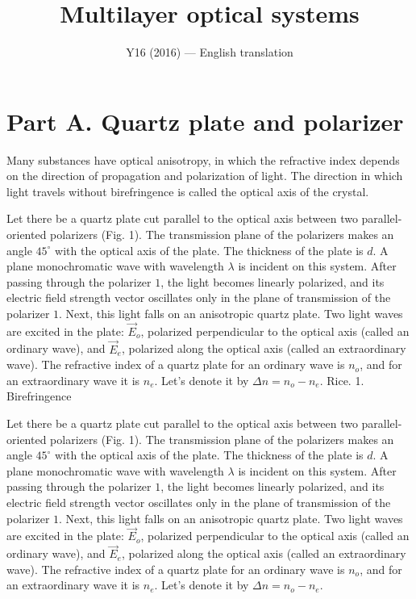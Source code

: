 \documentclass[11pt,a4paper]{article}
\title{\textbf{Multilayer optical systems}}
\author{\normalsize Y16 (2016) --- English translation}
\date{}
\begin{document}
\maketitle

\section*{Part A. Quartz plate and polarizer}

Many substances have optical anisotropy, in which the refractive index depends on the direction of propagation and polarization of light. The direction in which light travels without birefringence is called the optical axis of the crystal.

Let there be a quartz plate cut parallel to the optical axis between two parallel-oriented polarizers (Fig. 1). The transmission plane of the polarizers makes an angle $45^{\circ}$ with the optical axis of the plate. The thickness of the plate is $d$. A plane monochromatic wave with wavelength $\lambda$ is incident on this system. After passing through the polarizer $1$, the light becomes linearly polarized, and its electric field strength vector oscillates only in the plane of transmission of the polarizer $1$. Next, this light falls on an anisotropic quartz plate. Two light waves are excited in the plate: $\vec{E}_o$, polarized perpendicular to the optical axis (called an ordinary wave), and $\vec{E}_e$, polarized along the optical axis (called an extraordinary wave). The refractive index of a quartz plate for an ordinary wave is $n_o$, and for an extraordinary wave it is $n_e$. Let's denote it by $\Delta{n}=n_o-n_e$. Rice. 1. Birefringence

Let there be a quartz plate cut parallel to the optical axis between two parallel-oriented polarizers (Fig. 1). The transmission plane of the polarizers makes an angle $45^{\circ}$ with the optical axis of the plate. The thickness of the plate is $d$. A plane monochromatic wave with wavelength $\lambda$ is incident on this system. After passing through the polarizer $1$, the light becomes linearly polarized, and its electric field strength vector oscillates only in the plane of transmission of the polarizer $1$. Next, this light falls on an anisotropic quartz plate. Two light waves are excited in the plate: $\vec{E}_o$, polarized perpendicular to the optical axis (called an ordinary wave), and $\vec{E}_e$, polarized along the optical axis (called an extraordinary wave). The refractive index of a quartz plate for an ordinary wave is $n_o$, and for an extraordinary wave it is $n_e$. Let's denote it by $\Delta{n}=n_o-n_e$.
\end{document}
